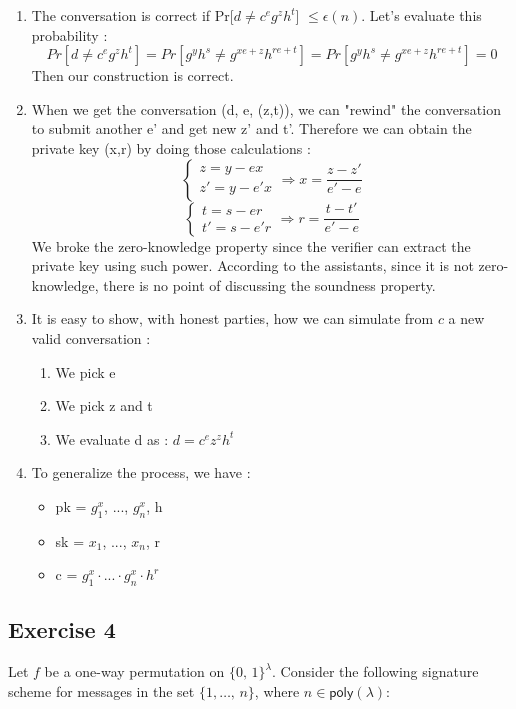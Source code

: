 \begin{solution}
  \begin{enumerate}
      \item The conversation is correct if Pr[$d \neq c^eg^zh^t$] $\leq \epsilon(n)$. Let's evaluate this probability : 
      $$Pr[d \neq c^eg^zh^t] = Pr[g^yh^s \neq g^{xe+z}h^{re+t}]  = Pr[g^yh^s \neq g^{xe+z}h^{re+t}] = 0$$
      Then our construction is correct.
      \item When we get the conversation (d, e, (z,t)), we can "rewind" the conversation to submit another e' and get new z' and t'. Therefore we can obtain the private key (x,r) by doing those calculations :
      $$\begin{cases} z = y - ex \\ z' = y - e'x \end{cases} \Rightarrow x = \frac{z-z'}{e'-e}
      $$
      $$\begin{cases} t = s - er \\ t' = s - e'r \end{cases} \Rightarrow r = \frac{t-t'}{e'-e}
      $$
      We broke the zero-knowledge property since the verifier can extract the private key using such power. \newline
      According to the assistants, since it is not zero-knowledge, there is no point of discussing the soundness property.
      \item It is easy to show, with honest parties, how we can simulate from $c$ a new valid conversation : 
      \begin{enumerate}
          \item We pick e 
          \item We pick z and t
          \item We evaluate d as : $d = c^ez^zh^t$
      \end{enumerate}
      \item To generalize the process, we have : 
      \begin{itemize}
          \item pk = $g^x_1$, ..., $g^x_n$, h
          \item sk = $x_1$, ..., $x_n$, r
          \item c = $g^x_1 \cdot ... \cdot g^x_n \cdot h^r$
      \end{itemize}
  \end{enumerate}
\end{solution}

\subsection{Exercise 4}
\label{subsec:4b.4}
Let $f$ be a one-way permutation on $\{0,\,1\}^\lambda$. 
Consider the following signature scheme for messages in the set 
$\{1,\ldots,\,n\}$, where $n\in\mathsf{poly}(\lambda)$: \vspace{3mm}

